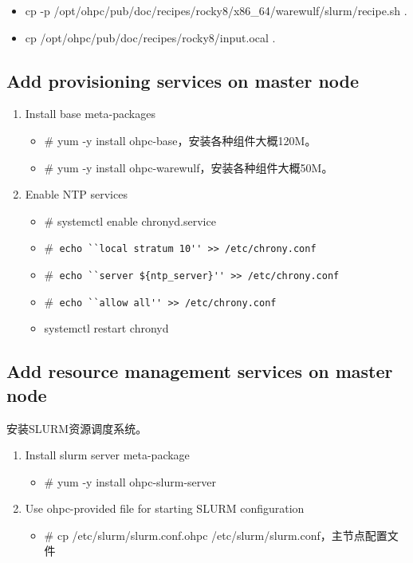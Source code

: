 {\begin{itemize}
\item cp -p /opt/ohpc/pub/doc/recipes/rocky8/x86\_64/warewulf/slurm/recipe.sh .

\item cp /opt/ohpc/pub/doc/recipes/rocky8/input.ocal .
\end{itemize}


\subsection{Add provisioning services on master node}
\begin{enumerate}
\item Install base meta-packages
\begin{itemize}
\item \# yum -y install ohpc-base，安装各种组件大概120M。
\item \# yum -y install ohpc-warewulf，安装各种组件大概50M。
\end{itemize}

\item Enable NTP services
\begin{itemize}
\item \# systemctl enable chronyd.service
\item \#\verb| echo ``local stratum 10'' >> /etc/chrony.conf | 
\item \#\verb| echo ``server ${ntp_server}'' >> /etc/chrony.conf |
\item \#\verb| echo ``allow all'' >> /etc/chrony.conf |
\item systemctl restart chronyd
\end{itemize}
\end{enumerate}





\subsection{Add resource management services on master node}
安装SLURM资源调度系统。
\begin{enumerate}
\item Install slurm server meta-package
\begin{itemize}
\item \# yum -y install ohpc-slurm-server
\end{itemize}

\item Use ohpc-provided file for starting SLURM configuration
\begin{itemize}
\item \# cp /etc/slurm/slurm.conf.ohpc /etc/slurm/slurm.conf，主节点配置文件
\end{itemize}


\end{enumerate}}
